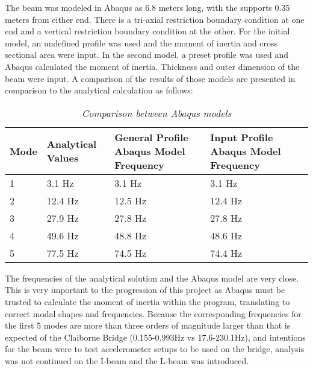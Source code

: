 \indent The beam was modeled in Abaqus as 6.8 meters long, with the supports 0.35 meters from either end. There is a tri-axial restriction boundary
condition at one end and a vertical restriction boundary condition at the other. For the initial model, an undefined profile was used and the moment of
inertia and cross sectional area were input. In the second model, a preset profile was used and Abaqus calculated the moment of inertia. Thickness and
outer dimension of the beam were input. A comparison of the results of those models are presented in comparison to the analytical calculation as
follows:


\begin{table}[H]

\begin{center}

\begin{tabular}{|l| p{4cm}| p{4cm}| p{4.5cm}| p{4.5cm}|}

\hline

Mode & Analytical Values & General Profile Abaqus Model Frequency&  Input Profile Abaqus Model Frequency \\

\hline

1 & 3.1 Hz & 3.1 Hz & 3.1 Hz \\\hline

2 & 12.4 Hz & 12.5 Hz & 12.4 Hz \\\hline

3 & 27.9 Hz & 27.8 Hz & 27.8 Hz \\\hline

4 & 49.6 Hz & 48.8 Hz & 48.6 Hz \\\hline

5 & 77.5 Hz & 74.5 Hz & 74.4 Hz \\\hline

\end{tabular}

\caption{\textit{Comparison between Abaqus models}}

\label{tab:FEM_Abaqus_Comp}

\end{center}

\end{table}

\indent The frequencies of the analytical solution and the Abaqus model are very close. This is very important to the progression of this project as
Abaqus must be trusted to calculate the moment of inertia within the program, translating to correct modal shapes and frequencies.
Because the corresponding frequencies
for the first 5 modes are more than three orders of magnitude larger than that is expected of the Claiborne Bridge (0.155-0.993Hz vs 17.6-230.1Hz), and
intentions for the beam were to test accelerometer setups to be used on the bridge, analysis was not continued on the I-beam and the L-beam was
introduced. 

